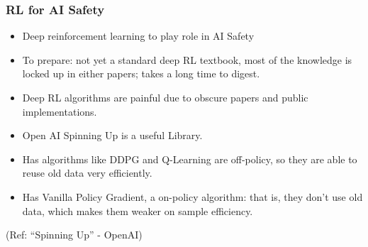 \begin{frame}\frametitle{RL for AI Safety}

\begin{itemize}
\item Deep reinforcement learning to play role in AI Safety
\item To prepare: not yet a standard deep RL textbook, most of the knowledge is locked up in either papers; takes a long time to digest.
\item Deep RL algorithms are painful due to obscure papers and public implementations.
\item Open AI Spinning Up is a useful Library.
\item Has algorithms like DDPG and Q-Learning are off-policy, so they are able to reuse old data very efficiently. 
\item Has Vanilla Policy Gradient, a on-policy algorithm: that is, they don’t use old data, which makes them weaker on sample efficiency. 
\end{itemize}

{\tiny (Ref: ``Spinning Up'' - OpenAI)}

\end{frame}
